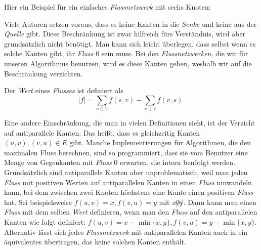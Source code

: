 Hier ein Beispiel für ein einfaches \emph{Flussnetzwerk} mit sechs Knoten:
\begin{center}
\end{center}

Viele Autoren setzen voraus, dass es keine Kanten in die \emph{Senke} und keine aus der \emph{Quelle} gibt. Diese Beschränkung ist zwar hilfreich fürs Verständnis, wird aber grundsätzlich nicht benötigt. Man kann sich leicht überlegen, dass selbst wenn es solche Kanten gibt, ihr \emph{Fluss} 0 sein muss. Bei den \emph{Flussnetzwerken}, die wir für unseren Algorithmus benutzen, wird es diese Kanten geben, weshalb wir auf die Beschränkung verzichten. 

\begin{definition}
	Der \emph{Wert} eines \emph{Flusses} ist definiert als
	\begin{equation}
		|f| = \sum_{v \in V}{f(s,v)} - \sum_{v \in V}{f(v,s)}.
	\end{equation} 
\end{definition}

Eine andere Einschränkung, die man in vielen Definitionen sieht, ist der Verzicht auf antiparallele Kanten. Das heißt, dass es gleichzeitig Kanten $(u,v), (v,u) \in E$ gibt. Manche Implementierungen für Algorithmen, die den maximalen Fluss berechnen, sind so programmiert, dass sie vom Benutzer eine Menge von Gegenkanten mit \emph{Fluss} 0 erwarten, die intern benötigt werden. Grundsätzlich sind antiparallele Kanten aber unproblematisch, weil man jeden \emph{Fluss} mit positiven Werten auf antiparallelen Kanten in einen \emph{Fluss} umwandeln kann, bei dem zwischen zwei Knoten höchstens eine Kante einen positiven \emph{Fluss} hat. Sei beispielsweise $f(u,v) = x, f(v,u) = y$ mit $x \not 0 \not y$. Dann kann man einen \emph{Fluss} mit dem selben \emph{Wert} definieren, wenn man den \emph{Fluss} auf den antiparallelen Kanten wie folgt definiert: $f(u,v) = x - \min\{x,y\}, f(v,u) = y - \min\{x,y\}$. Alternativ lässt sich jedes \emph{Flussnetzwerk} mit antiparallelen Kanten auch in ein äquivalentes übertragen, das keine solchen Kanten enthält.

